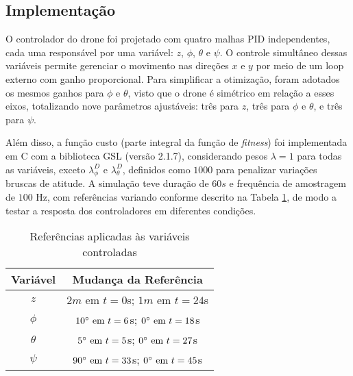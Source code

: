 \subsection{Implementação}
O controlador do drone foi projetado com quatro malhas PID independentes, cada uma responsável por 
uma variável: $z$, $\phi$, $\theta$ e $\psi$. O controle 
simultâneo dessas variáveis permite gerenciar o movimento nas direções $x$ e $y$ por meio de um 
loop externo com ganho proporcional. Para simplificar a otimização, foram adotados os mesmos ganhos para $\phi$ e $\theta$, 
visto que o drone é simétrico em relação a esses eixos, totalizando nove parâmetros ajustáveis: 
três para $z$, três para $\phi$ e $\theta$, e três para $\psi$.

Além disso, a função custo (parte integral da função de \textit{fitness}) 
foi implementada em C com a biblioteca GSL (versão 2.1.7), considerando pesos $\lambda = 1$ para 
todas as variáveis, exceto $\lambda^D_{\phi}$ e $\lambda^D_{\theta}$, definidos como $1000$ para 
penalizar variações bruscas de atitude. A simulação teve duração de $60s$ e frequência de amostragem 
de $100$ Hz, com referências variando conforme descrito na Tabela \ref{tab:ref_traj}, de modo a 
testar a resposta dos controladores em diferentes condições.
\vspace{-0.2cm}
\begin{table}[h!]
    \centering
    \caption{Referências aplicadas às variáveis controladas}
    \begin{tabular}{|c|c|}
        \hline
        \textbf{Variável} & \textbf{Mudança da Referência} \\
        \hline
        $z$ & $2m \text{ em } t=0$s; $1m \text{ em } t=24$s \\
        \hline
        $\phi$ & $10\degree \text{ em } t=6$s; $0\degree \text{ em } t=18$s \\
        \hline
        $\theta$ & $5\degree \text{ em } t=5$s; $0\degree \text{ em } t=27$s \\
        \hline
        $\psi$ & $90\degree \text{ em } t=33$s; $0\degree \text{ em } t=45$s \\
        \hline
    \end{tabular}%
    \label{tab:ref_traj}
\end{table}

